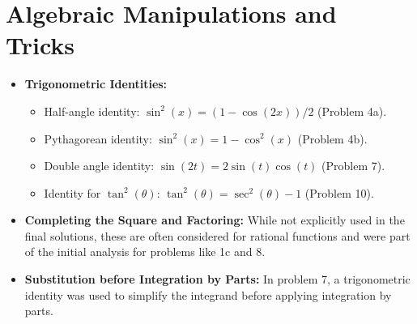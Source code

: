 \documentclass{article}
\begin{document}
\section{Algebraic Manipulations and Tricks}
\begin{itemize}
    \item \textbf{Trigonometric Identities:}
    \begin{itemize}
        \item Half-angle identity: $ \sin^2(x) = (1-\cos(2x))/2 $ (Problem 4a).
        \item Pythagorean identity: $ \sin^2(x) = 1-\cos^2(x) $ (Problem 4b).
        \item Double angle identity: $ \sin(2t) = 2\sin(t)\cos(t) $ (Problem 7).
        \item Identity for $ \tan^2(\theta) $: $ \tan^2(\theta) = \sec^2(\theta) - 1 $ (Problem 10).
    \end{itemize}
    \item \textbf{Completing the Square and Factoring:} While not explicitly used in the final solutions, these are often considered for rational functions and were part of the initial analysis for problems like 1c and 8.
    \item \textbf{Substitution before Integration by Parts:} In problem 7, a trigonometric identity was used to simplify the integrand before applying integration by parts.
\end{itemize}
\end{document}
